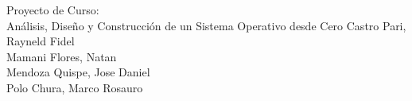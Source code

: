 \documentclass[letterpaper,12pt]{report}
\begin{document}


\thesistitle
    {Proyecto de Curso: \\ 
     Análisis, Diseño y Construcción de un Sistema Operativo desde Cero}
    {Castro Pari, Rayneld Fidel \\ 
     Mamani Flores, Natan \\ 
     Mendoza Quispe, Jose Daniel \\ 
     Polo Chura, Marco Rosauro}
\end{document}
